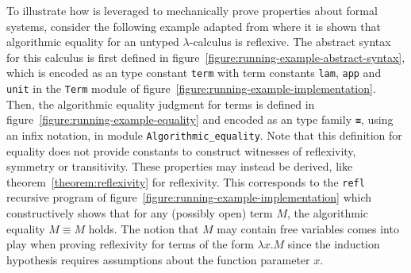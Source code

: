To illustrate how \Beluga is leveraged to mechanically prove properties about formal systems, consider the following example adapted from \cite{felty2010reasoning} where it is shown that algorithmic equality for an untyped $\lambda$-calculus is reflexive.
The abstract syntax for this calculus is first defined in figure~\ref{figure:running-example-abstract-syntax}, which is encoded as an \LF type constant \verb|term| with term constants \verb|lam|, \verb|app| and \verb|unit| in the \verb|Term| module of figure~\ref{figure:running-example-implementation}.
Then, the algorithmic equality judgment for terms is defined in figure~\ref{figure:running-example-equality} and encoded as an \LF type family \verb|≡|, using an infix notation, in module \verb|Algorithmic_equality|.
Note that this definition for equality does not provide constants to construct witnesses of reflexivity, symmetry or transitivity.
These properties may instead be derived, like theorem~\ref{theorem:reflexivity} for reflexivity.
This corresponds to the \verb|refl| recursive program of figure~\ref{figure:running-example-implementation} which constructively shows that for any (possibly open) term $M$, the algorithmic equality $M \equiv M$ holds.
The notion that $M$ may contain free variables comes into play when proving reflexivity for terms of the form $\lambda x. M$ since the induction hypothesis requires assumptions about the function parameter $x$.

